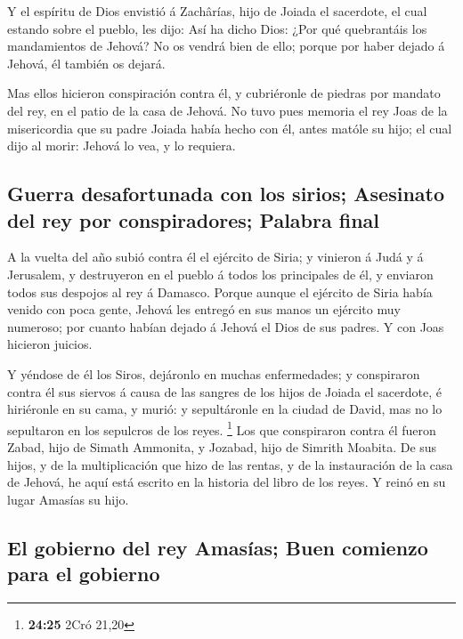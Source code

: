  Y el espíritu de Dios envistió á Zachârías, hijo de
Joiada el sacerdote, el cual estando sobre el pueblo, les dijo: Así ha
dicho Dios: ¿Por qué quebrantáis los mandamientos de Jehová? No os
vendrá bien de ello; porque por haber dejado á Jehová, él también os
dejará.

 Mas ellos hicieron conspiración contra él, y cubriéronle
de piedras por mandato del rey, en el patio de la casa de Jehová.
 No tuvo pues memoria el rey Joas de la misericordia que
su padre Joiada había hecho con él, antes matóle su hijo; el cual dijo
al morir: Jehová lo vea, y lo requiera.

\hypertarget{guerra-desafortunada-con-los-sirios-asesinato-del-rey-por-conspiradores-palabra-final}{%
\subsection{Guerra desafortunada con los sirios; Asesinato del rey por
conspiradores; Palabra
final}\label{guerra-desafortunada-con-los-sirios-asesinato-del-rey-por-conspiradores-palabra-final}}

 A la vuelta del año subió contra él el ejército de
Siria; y vinieron á Judá y á Jerusalem, y destruyeron en el pueblo á
todos los principales de él, y enviaron todos sus despojos al rey á
Damasco.  Porque aunque el ejército de Siria había venido
con poca gente, Jehová les entregó en sus manos un ejército muy
numeroso; por cuanto habían dejado á Jehová el Dios de sus padres. Y con
Joas hicieron juicios.

 Y yéndose de él los Siros, dejáronlo en muchas
enfermedades; y conspiraron contra él sus siervos á causa de las sangres
de los hijos de Joiada el sacerdote, é hiriéronle en su cama, y murió: y
sepultáronle en la ciudad de David, mas no lo sepultaron en los
sepulcros de los reyes. \footnote{\textbf{24:25} 2Cró 21,20}
 Los que conspiraron contra él fueron Zabad, hijo de
Simath Ammonita, y Jozabad, hijo de Simrith Moabita.  De
sus hijos, y de la multiplicación que hizo de las rentas, y de la
instauración de la casa de Jehová, he aquí está escrito en la historia
del libro de los reyes. Y reinó en su lugar Amasías su hijo.

\hypertarget{el-gobierno-del-rey-amasuxedas-buen-comienzo-para-el-gobierno}{%
\subsection{El gobierno del rey Amasías; Buen comienzo para el
gobierno}\label{el-gobierno-del-rey-amasuxedas-buen-comienzo-para-el-gobierno}}

